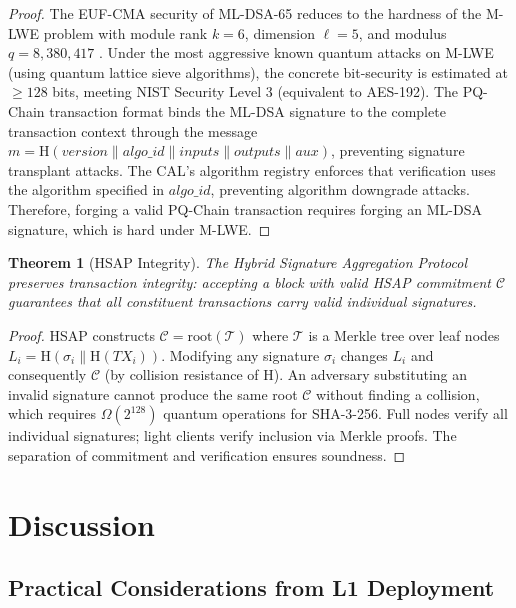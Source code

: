 \documentclass[12pt, a4paper, twocolumn]{article}
\newtheorem{theorem}{Theorem}
\begin{document}
\begin{proof}
The EUF-CMA security of ML-DSA-65 reduces to the hardness of the M-LWE problem with module rank $k=6$, dimension $\ell=5$, and modulus $q=8{,}380{,}417$ \cite{ducas2018crystals}. Under the most aggressive known quantum attacks on M-LWE (using quantum lattice sieve algorithms), the concrete bit-security is estimated at $\geq 128$ bits, meeting NIST Security Level 3 (equivalent to AES-192). The PQ-Chain transaction format binds the ML-DSA signature to the complete transaction context through the message $m = \text{H}(\mathit{version} \| \mathit{algo\_id} \| \mathit{inputs} \| \mathit{outputs} \| \mathit{aux})$, preventing signature transplant attacks. The CAL's algorithm registry enforces that verification uses the algorithm specified in $\mathit{algo\_id}$, preventing algorithm downgrade attacks. Therefore, forging a valid PQ-Chain transaction requires forging an ML-DSA signature, which is hard under M-LWE.
\end{proof}

\begin{theorem}[HSAP Integrity]
The Hybrid Signature Aggregation Protocol preserves transaction integrity: accepting a block with valid HSAP commitment $\mathcal{C}$ guarantees that all constituent transactions carry valid individual signatures.
\end{theorem}

\begin{proof}
HSAP constructs $\mathcal{C} = \text{root}(\mathcal{T})$ where $\mathcal{T}$ is a Merkle tree over leaf nodes $L_i = \text{H}(\sigma_i \| \text{H}(TX_i))$. Modifying any signature $\sigma_i$ changes $L_i$ and consequently $\mathcal{C}$ (by collision resistance of H). An adversary substituting an invalid signature cannot produce the same root $\mathcal{C}$ without finding a collision, which requires $\Omega(2^{128})$ quantum operations for SHA-3-256. Full nodes verify all individual signatures; light clients verify inclusion via Merkle proofs. The separation of commitment and verification ensures soundness.
\end{proof}

\section{Discussion}
\label{sec:discussion}

\subsection{Practical Considerations from L1 Deployment}
\end{document}
